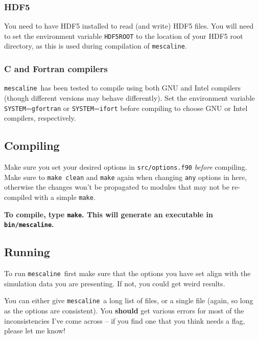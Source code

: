 \documentclass[a4paper]{article}
\newcommand{\mesc}{\texttt{mescaline}}
\begin{document}
\subsubsection{HDF5}

You need to have HDF5 installed to read (and write) HDF5 files. You will need to set the environment variable \texttt{HDF5ROOT} to the location of your HDF5 root directory, as this is used during compilation of \mesc. 

\subsubsection{C and Fortran compilers}

\mesc\, has been tested to compile using both GNU and Intel compilers (though different versions may behave differently). Set the environment variable \texttt{SYSTEM}=\texttt{gfortran} or \texttt{SYSTEM}=\texttt{ifort} before compiling to choose GNU or Intel compilers, respectively. 


\subsection{Compiling}

Make sure you set your desired options in \texttt{src/options.f90} \textit{before} compiling. Make sure to \texttt{make clean} and \texttt{make} again when changing \texttt{any} options in here, otherwise the changes won't be propagated to modules that may not be re-compiled with a simple \texttt{make}.

{\bf To compile, type \texttt{make}. This will generate an executable in \texttt{bin/mescaline}.}



\subsection{Running}

To run \mesc\, first make sure that the options you have set align with the simulation data you are presenting. If not, you could get weird results. 

You can either give \mesc\, a long list of files, or a single file (again, so long as the options are consistent). You {\bf should} get various errors for most of the inconsistencies I've come across -- if you find one that you think needs a flag, please let me know!
\end{document}
